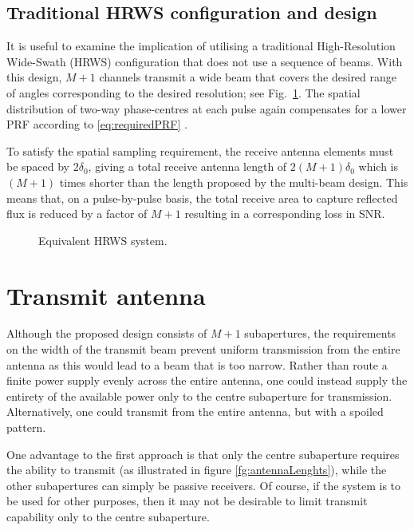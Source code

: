 \documentclass[journal]{IEEEtran}
\newcommand{\resxDesired}{\ensuremath{\delta_0}}
\begin{document}
\subsection{Traditional HRWS configuration and design}
It is useful to examine the implication of utilising a traditional High-Resolution Wide-Swath (HRWS) configuration that does not use a sequence of beams. With this design, $M+1$ channels transmit a wide beam that covers the desired range of angles corresponding to the desired resolution; see Fig.~\ref{fg:equivHRWS}. The spatial distribution of two-way phase-centres at each pulse again compensates for a lower PRF according to \eqref{eq:requiredPRF} \cite{GebertPHD}.
\par
To satisfy the spatial sampling requirement, the receive antenna elements must be spaced by $2\resxDesired$, giving a total receive antenna length of $2(M+1)\resxDesired$ which is $(M+1)$ times shorter than the length proposed by the multi-beam design. This means that, on a pulse-by-pulse basis, the total receive area to capture reflected flux is reduced by a factor of $M+1$ resulting in a corresponding loss in SNR.
\begin{figure}[h!]
\begin{center}
 \resizebox{0.9\columnwidth}{!}{}
 \caption{Equivalent HRWS system.}
 \label{fg:equivHRWS}
 \end{center}
\end{figure}


\section{Transmit antenna}
Although the proposed design consists of $M+1$ subapertures, the requirements on the width of the transmit beam prevent uniform transmission from the entire antenna as this would lead to a beam that is too narrow. Rather than route a finite power supply evenly across the entire antenna, one could instead supply the entirety of the available power only to the centre subaperture for transmission. Alternatively, one could transmit from the entire antenna, but with a spoiled pattern.
\par
One advantage to the first approach is that only the centre subaperture requires the ability to transmit (as illustrated in figure \ref{fg:antennaLenghts}), while the other subapertures can simply be passive receivers. Of course, if the system is to be used for other purposes, then it may not be desirable to limit transmit capability only to the centre subaperture.
\end{document}
